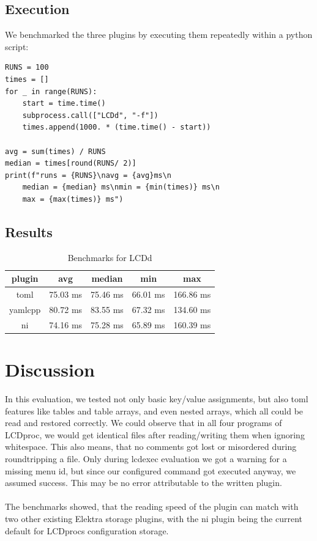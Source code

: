 \documentclass[draft,final]{vutinfth} %
\begin{document}
\subsection{Execution}
We benchmarked the three plugins by executing them repeatedly within a python script:
\begin{Verbatim}[frame=single, fontsize=\small]
RUNS = 100
times = []
for _ in range(RUNS):
	start = time.time()
	subprocess.call(["LCDd", "-f"])
	times.append(1000. * (time.time() - start))

avg = sum(times) / RUNS
median = times[round(RUNS/ 2)]
print(f"runs = {RUNS}\navg = {avg}ms\n
    median = {median} ms\nmin = {min(times)} ms\n
    max = {max(times)} ms")
\end{Verbatim}
\subsection{Results}
\FloatBarrier
\begin{table}[!ht]
	\centering
	\begin{tabular}{ccccc}
	\toprule
	plugin & avg & median & min & max \\
	\midrule
	toml 	& 75.03 ms	& 75.46 ms	& 66.01 ms	& 166.86 ms \\
	yamlcpp & 80.72 ms	& 83.55 ms	& 67.32 ms	& 134.60 ms \\
	ni		& 74.16 ms	& 75.28 ms	& 65.89 ms	& 160.39 ms \\
	\bottomrule
	\end{tabular}
	\caption{Benchmarks for LCDd}
	\label{tab:benchmarks}
\end{table}
\FloatBarrier

\section{Discussion}
In this evaluation, we tested not only basic key/value assignments, but also \acrshort{toml} features like tables and table arrays, and even nested arrays, which all could be read and restored correctly.
We could observe that in all four programs of LCDproc, we would get identical files after reading/writing them when ignoring whitespace.
This also means, that no comments got lost or misordered during roundtripping a file.
Only during lcdexec evaluation we got a warning for a missing menu id, but since our configured command got executed anyway, we assumed success. This may be no error attributable to the written plugin.
\\\\
The benchmarks showed, that the reading speed of the plugin can match with two other existing Elektra storage plugins, with the ni plugin being the current default for LCDprocs configuration storage.
\end{document}
